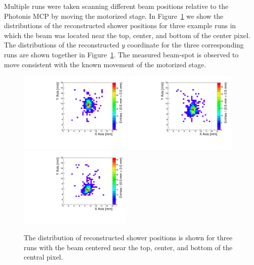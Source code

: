 \documentclass[12pt]{article}
\begin{document}
{Multiple runs were taken scanning different beam positions relative to the Photonis MCP by moving
the motorized stage. In Figure~\ref{fig:EMShowerPositions} we show the distributions of the
reconstructed shower positions for three example runs in which the beam was
located near the top, center, and bottom of the center pixel. The distributions
of the reconstructed $y$ coordinate for the three corresponding runs are shown 
together in Figure~\ref{fig:EMShowerPositions}. The measured 
beam-spot is observed to move consistent with the known movement of the 
motorized stage. 

\begin{figure}[htbp]
	\centering
	\includegraphics[width=0.49\textwidth]{Images/centers/run30dist.pdf}
	\includegraphics[width=0.49\textwidth]{Images/centers/run32dist.pdf}
	\includegraphics[width=0.49\textwidth]{Images/centers/run34dist.pdf}

	\caption{The distribution of reconstructed shower positions is shown
	for three runs with the beam centered near the top, center, and bottom of the
	central pixel. }
	\label{fig:EMShowerPositions}
\end{figure}

}
\end{document}
